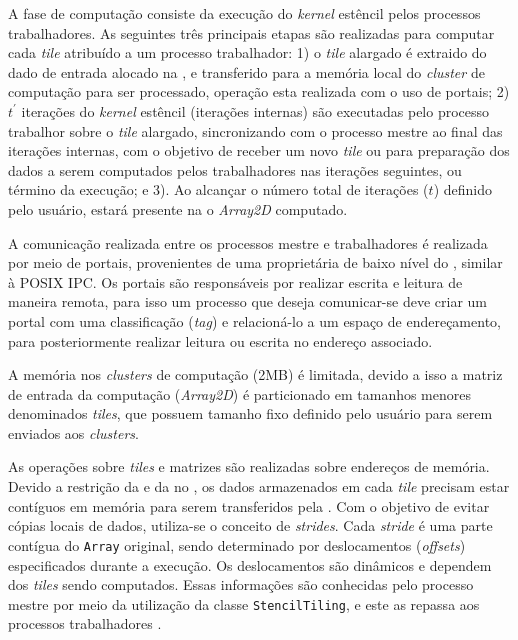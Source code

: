 A fase de computação consiste da execução do \emph{kernel} estêncil pelos processos trabalhadores. As seguintes três principais etapas são realizadas para computar cada \emph{tile} atribuído a um processo trabalhador: 1) o \emph{tile} alargado é extraido do dado de entrada alocado na \lpddr, e transferido para a memória local do \emph{cluster} de computação para ser processado, operação esta realizada com o uso de portais; 2) $t^\prime$ iterações do \emph{kernel} estêncil (iterações internas) são executadas pelo processo trabalhor sobre o \emph{tile} alargado, sincronizando com o processo mestre ao final das iterações internas, com o objetivo de receber um novo \textit{tile} ou para preparação dos dados a serem computados pelos trabalhadores nas iterações seguintes, ou término da execução; e 3). Ao alcançar o número total de iterações ($t$) definido pelo usuário, estará presente na \lpddr o \textit{Array2D} computado.

A comunicação realizada entre os processos mestre e trabalhadores é realizada por meio de portais, provenientes de uma \api proprietária de baixo nível do \mppa, similar à POSIX IPC. Os portais são responsáveis por realizar escrita e leitura de maneira remota, para isso um processo que deseja comunicar-se deve criar um portal com uma classificação (\textit{tag}) e relacioná-lo a um espaço de endereçamento, para posteriormente realizar leitura ou escrita no endereço associado.

A memória nos \textit{clusters} de computação (2MB) é limitada, devido a isso a matriz de entrada da computação (\textit{Array2D}) é particionado em tamanhos menores denominados \textit{tiles}, que possuem tamanho fixo definido pelo usuário para serem enviados aos \textit{clusters}.

As operações sobre \textit{tiles} e matrizes são realizadas sobre endereços de memória. Devido a restrição da \api e da \noc no \mppa, os dados armazenados em cada \textit{tile} precisam estar contíguos em memória para serem transferidos
pela \noc. Com o objetivo de evitar cópias locais de dados, utiliza-se o conceito de \textit{strides}. Cada \textit{stride} é uma parte contígua do \texttt{Array} original, sendo determinado por deslocamentos (\textit{offsets}) especificados durante a
execução. Os deslocamentos são dinâmicos e dependem dos \textit{tiles} sendo computados. Essas informações são conhecidas pelo processo mestre por meio da utilização da classe \texttt{StencilTiling}, e este as repassa aos processos trabalhadores \cite{Podesta:TCC}.

